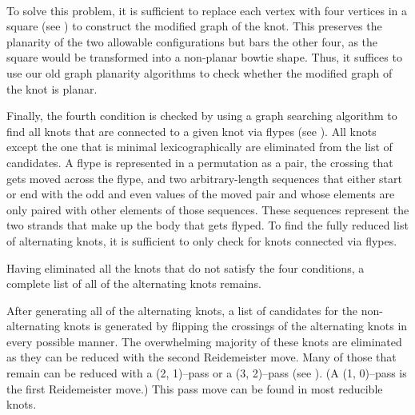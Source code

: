 \begin{paper}
\\


To solve this problem, it is sufficient to replace each vertex with four
vertices in a square (see \figGraph) to construct the modified graph of the
knot.
This preserves the planarity of the two allowable configurations but bars the
other four, as the square would be transformed into a non-planar bowtie shape.
Thus, it suffices to use our old graph planarity algorithms to check whether the
modified graph of the knot is planar.


Finally, the fourth condition is checked by using a graph searching algorithm to
find all knots that are connected to a given knot via flypes (see \figMoves).
All knots except the one that is minimal lexicographically are eliminated from
the list of candidates.
A flype is represented in a permutation as a pair, the crossing that gets moved
across the flype, and two arbitrary-length sequences that either start or end
with the odd and even values of the moved pair and whose elements are only
paired with other elements of those sequences.
These sequences represent the two strands that make up the body that gets
flyped.
To find the fully reduced list of alternating knots, it is sufficient to only
check for knots connected via flypes.


Having eliminated all the knots that do not satisfy the four conditions, a
complete list of all of the alternating knots remains.



After generating all of the alternating knots, a list of candidates for the
non-alternating knots is generated by flipping the crossings of the alternating
knots in every possible manner.
The overwhelming majority of these knots are eliminated as they can be reduced
with the second Reidemeister move.
Many of those that remain can be reduced with a (2, 1)--pass or a (3, 2)--pass
(see \figMoves).
(A (1, 0)--pass is the first Reidemeister move.)
This pass move can be found in most reducible knots.


\end{paper}
